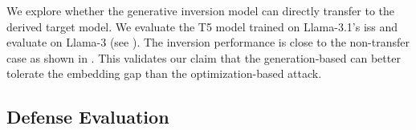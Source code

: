 \documentclass[letterpaper,twocolumn,10pt]{article}
\newcommand{\llama}{Llama}
\newcommand{\iheading}[1]{{\vspace{4pt}\noindent{\textit{#1}}}}
\theoremstyle{definition}
\begin{document}
\iheading{Transferability.}
We explore whether the generative inversion model can directly transfer to the derived target model.
We evaluate the T5 model trained on \llama-3.1's \acp{is} and evaluate on \llama-3 (see ).
The inversion performance is close to the non-transfer case as shown in .
This validates our claim that the generation-based can better tolerate the embedding gap than the optimization-based attack.

\begin{table}[t]
\caption{Transferability of generative inversion to Llama-3.}
\label{tab:gen-blackbox-transfer-llama3}
\end{table}























\subsection{Defense Evaluation}
\label{subsec:defense}
\end{document}

